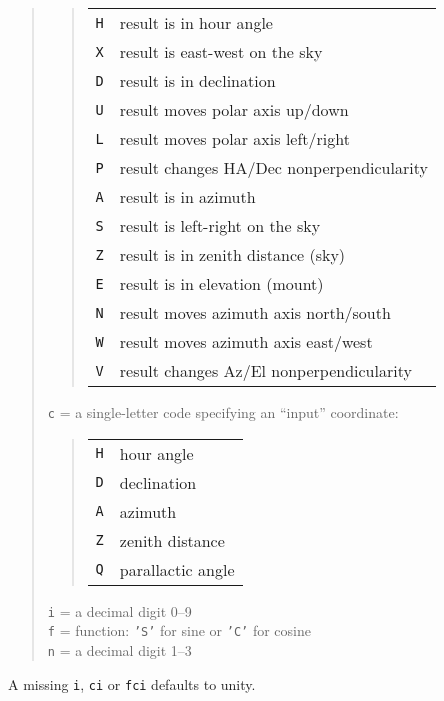 \documentclass[12pt,fleqn,twoside]{article}
\renewcommand{\_}{{\tt\char'137}}     %
\begin{document}
{\begin{enumerate}
\begin{quote}
        \begin{quote}
        \begin{tabular}{cl}
          {\tt H} & result is in hour angle \\
          {\tt X} & result is east-west on the sky \\
          {\tt D} & result is in declination \\
          {\tt U} & result moves polar axis up/down \\
          {\tt L} & result moves polar axis left/right \\
          {\tt P} & result changes HA/Dec nonperpendicularity \\
          {\tt A} & result is in azimuth \\
          {\tt S} & result is left-right on the sky \\
          {\tt Z} & result is in zenith distance (sky) \\
          {\tt E} & result is in elevation (mount) \\
          {\tt N} & result moves azimuth axis north/south \\
          {\tt W} & result moves azimuth axis east/west \\
          {\tt V} & result changes Az/El nonperpendicularity \\
        \end{tabular}
        \end{quote}
        {\tt c} = a single-letter code specifying an ``input'' coordinate:
        \begin{quote}
        \begin{tabular}{cl}
          {\tt H} & hour angle \\
          {\tt D} & declination \\
          {\tt A} & azimuth \\
          {\tt Z} & zenith distance \\
          {\tt Q} & parallactic angle \\
        \end{tabular}
        \end{quote}
        {\tt i} = a decimal digit 0--9 \\
        {\tt f} = function: {\tt 'S'} for sine or {\tt 'C'} for cosine \\
        {\tt n} = a decimal digit 1--3
      \end{quote}
      A missing {\tt i}, {\tt ci} or {\tt fci} defaults to unity.


\end{enumerate}}
\end{document}
